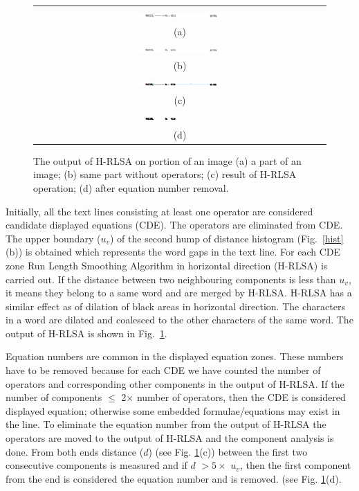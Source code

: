 \begin{figure}[h]
\center\footnotesize 
\begin{tabular}{|c|}
\hline
 \includegraphics[width=0.3\textwidth]{equation.png} \\ (a)\\  
 \includegraphics[width=0.3\textwidth]{equationOperands.png} \\ (b)\\  
\includegraphics[width=0.3\textwidth]{equationNumber.png} \\ (c) \\ 
\includegraphics[width=0.3\textwidth]{hrlsaRemoval.png} \\ (d) \\ 
\hline 
\end{tabular}
\caption{The output of H-RLSA on portion of an image (a) a part of an image; (b) same part without operators; (c) result of H-RLSA operation; (d) after equation number removal.}
\label{h-rlsa} 
\end{figure} 
Initially, all the text lines consisting at least one operator
are considered candidate displayed equations (CDE). The
operators are eliminated from CDE. The upper boundary ($u_v$) of
the second hump of distance histogram (Fig.~\ref{hist}(b)) is obtained which
represents the word gaps in the text line. For each CDE zone Run
Length Smoothing Algorithm in horizontal direction (H-RLSA) is
carried out. If the distance between two neighbouring components
is less than $u_v$, it means they belong to a same word and are
merged by H-RLSA. H-RLSA has a similar effect as of dilation of
black areas in horizontal direction. The characters in a word
are dilated and coalesced to the other characters of the same
word. The output of H-RLSA is shown in Fig.~\ref{h-rlsa}.

Equation numbers are common in the displayed equation zones.
These numbers have to be removed because for each CDE we have
counted the number of operators and corresponding other
components in the output of H-RLSA. If the number of components
$\le$ 2$\times$ number of operators, then the CDE is considered
displayed equation; otherwise some embedded formulae/equations
may exist in the line. To eliminate the equation number from the
output of H-RLSA the operators are moved to the output of H-RLSA
and the component analysis is done. From both ends distance
($d$) (see Fig. \ref{h-rlsa}(c))
 between the first two consecutive
components is measured and if $d$ $> 5\times$ $u_v$, then the
first component from the end is considered the equation number
and is removed. (see Fig. \ref{h-rlsa}(d).

